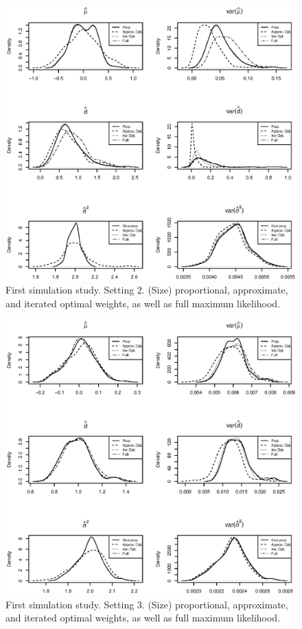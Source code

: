 \documentclass[11pt,a5paper,twoside]{book}
\begin{document}
{\begin{figure}[!t]
\includegraphics[width=\textwidth]{aSetting2_opt.eps}
\caption{\small \linespread{1.1} First simulation study. Setting 2. (Size) proportional, approximate, and iterated optimal weights, as well as full maximum likelihood.} \label{Setting2_opt}
\end{figure}
\begin{figure}[!t]
\centering
\includegraphics[width=\textwidth]{aSetting3_opt.eps}
\caption{\small \linespread{1.1} First simulation study. Setting 3. (Size) proportional, approximate, and iterated optimal weights, as well as full maximum likelihood.} \label{Setting3_opt}
\end{figure}

}
\end{document}
